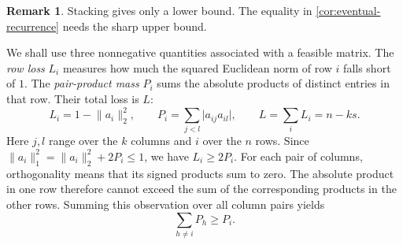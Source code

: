 \documentclass[11pt]{article}
\numberwithin{equation}{section}
\theoremstyle{definition}
\theoremstyle{definition}
\newtheorem{remark}[remark]{Remark}
\newcommand{\abs}[1]{\lvert#1\rvert}
\newcommand{\norm}[1]{\lVert#1\rVert}
\begin{document}
\begin{remark}
Stacking gives only a lower bound.  The equality in
\cref{cor:eventual-recurrence} needs the sharp upper bound.
\end{remark}

We shall use three nonnegative quantities associated with a feasible
matrix. The \emph{row loss} $L_i$ measures how much the squared
Euclidean norm of row $i$ falls short of $1$. The \emph{pair-product
mass} $P_i$ sums the absolute products of distinct entries in that
row. Their total loss is $L$:
\[
 L_i=1-\norm{a_i}_2^2,\qquad
 P_i=\sum_{j<l}\abs{a_{ij}a_{il}},\qquad L=\sum_iL_i=n-ks.
\]
Here $j,l$ range over the $k$ columns and $i$ over the $n$ rows.
Since $\norm{a_i}_1^2=\norm{a_i}_2^2+2P_i\le1$,
we have $L_i\ge2P_i$.
For each pair of columns, orthogonality means that its signed products
sum to zero. The absolute product in one row therefore cannot exceed
the sum of the corresponding products in the other rows.
Summing this observation over all column pairs yields
\begin{equation}\label{eq:cancellation}
 \sum_{h\ne i}P_h\ge P_i.
\end{equation}
\end{document}
